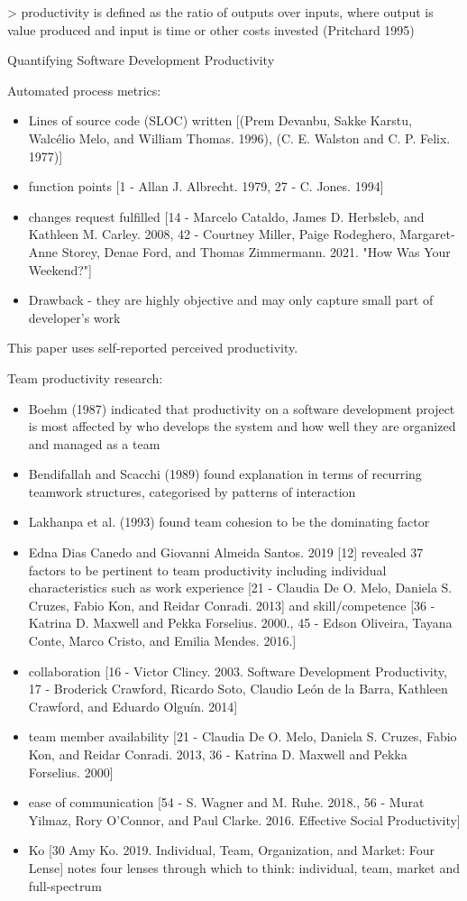 > productivity is defined as the ratio of outputs over
inputs, where output is value produced and input is time or other
costs invested (Pritchard 1995)

Quantifying Software Development Productivity

Automated process metrics:

\begin{itemize}
    \item Lines of source code (SLOC) written [(Prem Devanbu, Sakke Karstu, Walcélio Melo, and William Thomas. 1996), (C. E. Walston and C. P. Felix. 1977)]
    \item function points [1 - Allan J. Albrecht. 1979, 27 - C. Jones. 1994]
    \item changes request fulfilled [14 - Marcelo Cataldo, James D. Herbsleb, and Kathleen M. Carley. 2008, 42 - Courtney Miller, Paige Rodeghero, Margaret-Anne Storey, Denae Ford, and Thomas Zimmermann. 2021. "How Was Your Weekend?"]
    \item Drawback - they are highly objective and may only capture small part of developer's work
\end{itemize}

This paper uses self-reported perceived productivity.

Team productivity research:

\begin{itemize}
    \item  Boehm (1987) indicated that productivity on a software development project is most affected by who develops the system and how well they are organized and managed as a team
    \item Bendifallah and Scacchi (1989) found explanation in terms of recurring teamwork structures, categorised by patterns of interaction
    \item Lakhanpa et al. (1993) found team cohesion to be the dominating factor
    \item Edna Dias Canedo and Giovanni Almeida Santos. 2019 [12] revealed 37 factors to be pertinent to team productivity including individual characteristics such as work experience [21 - Claudia De O. Melo, Daniela S. Cruzes, Fabio Kon, and Reidar Conradi. 2013] and skill/competence [36 - Katrina D. Maxwell and Pekka Forselius. 2000., 45 - Edson Oliveira, Tayana Conte, Marco Cristo, and Emilia Mendes. 2016.]
    \item collaboration [16 - Victor Clincy. 2003. Software Development Productivity, 17 - Broderick Crawford, Ricardo Soto, Claudio León de la Barra, Kathleen Crawford, and Eduardo Olguín. 2014]
    \item team member availability [21 - Claudia De O. Melo, Daniela S. Cruzes, Fabio Kon, and Reidar Conradi. 2013, 36 - Katrina D. Maxwell and Pekka Forselius. 2000]
    \item ease of communication [54 - S. Wagner and M. Ruhe. 2018., 56 - Murat Yilmaz, Rory O’Connor, and Paul Clarke. 2016. Effective Social Productivity]
    \item Ko [30 Amy Ko. 2019. Individual, Team, Organization, and Market: Four Lense] notes four lenses through which to think: individual, team, market and full-spectrum
\end{itemize}

